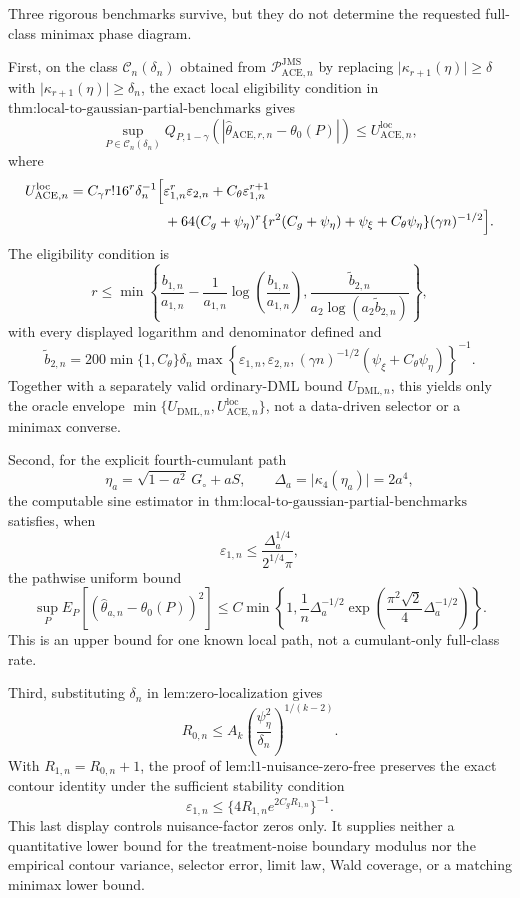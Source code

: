 Three rigorous benchmarks survive, but they do not determine the requested full-class minimax phase diagram.

First, on the class \(\mathcal C_n(\delta_n)\) obtained from \(\mathcal P_{\mathrm{ACE},n}^{\mathrm{JMS}}\) by replacing \(\lvert\kappa_{r+1}(\eta)\rvert\ge\delta\) with \(\lvert\kappa_{r+1}(\eta)\rvert\ge\delta_n\), the exact local eligibility condition in \(\text{thm:local-to-gaussian-partial-benchmarks}\) gives
\[
 \sup_{P\in\mathcal C_n(\delta_n)}
 Q_{P,1-\gamma}
 \!\left(\left|\widehat\theta_{\mathrm{ACE},r,n}-\theta_0(P)\right|\right)
 \le U_{\mathrm{ACE},n}^{\mathrm{loc}},
\]
where
\[
\begin{aligned}
 U_{\mathrm{ACE},n}^{\mathrm{loc}}
 &=C_{\gamma}r!16^r\delta_n^{-1}
 \Bigl[
   \varepsilon_{1,n}^r\varepsilon_{2,n}
   +C_{\theta}\varepsilon_{1,n}^{r+1}\\
 &\hspace{24mm}
   +64(C_g+\psi_{\eta})^r
    \{r^2(C_g+\psi_{\eta})+\psi_{\xi}+C_{\theta}\psi_{\eta}\}
    (\gamma n)^{-1/2}
 \Bigr].
\end{aligned}
\]
The eligibility condition is
\[
 r\le
 \min\!\left\{
   \frac{b_{1,n}}{a_{1,n}}
   -\frac{1}{a_{1,n}}\log\!\left(\frac{b_{1,n}}{a_{1,n}}\right),
   \frac{\widetilde b_{2,n}}{a_2\log(a_2\widetilde b_{2,n})}
 \right\},
\]
with every displayed logarithm and denominator defined and
\[
 \widetilde b_{2,n}
 =200\min\{1,C_{\theta}\}\delta_n
 \max\!\left\{
   \varepsilon_{1,n},\varepsilon_{2,n},
   (\gamma n)^{-1/2}(\psi_{\xi}+C_{\theta}\psi_{\eta})
 \right\}^{-1}.
\]
Together with a separately valid ordinary-DML bound \(U_{\mathrm{DML},n}\), this yields only the oracle envelope \(\min\{U_{\mathrm{DML},n},U_{\mathrm{ACE},n}^{\mathrm{loc}}\}\), not a data-driven selector or a minimax converse.

Second, for the explicit fourth-cumulant path
\[
 \eta_a=\sqrt{1-a^2}\,G_{\circ}+aS,
 \qquad
 \Delta_a=\lvert\kappa_4(\eta_a)\rvert=2a^4,
\]
the computable sine estimator in \(\text{thm:local-to-gaussian-partial-benchmarks}\) satisfies, when
\[
 \varepsilon_{1,n}\le\frac{\Delta_a^{1/4}}{2^{1/4}\pi},
\]
the pathwise uniform bound
\[
 \sup_P E_P\!\left[(\widehat\theta_{a,n}-\theta_0(P))^2\right]
 \le
 C\min\!\left\{
  1,\frac{1}{n}\Delta_a^{-1/2}
  \exp\!\left(\frac{\pi^2\sqrt2}{4}\Delta_a^{-1/2}\right)
 \right\}.
\]
This is an upper bound for one known local path, not a cumulant-only full-class rate.

Third, substituting \(\delta_n\) in \(\text{lem:zero-localization}\) gives
\[
 R_{0,n}\le A_k
 \left(\frac{\psi_{\eta}^2}{\delta_n}\right)^{1/(k-2)}.
\]
With \(R_{1,n}=R_{0,n}+1\), the proof of \(\text{lem:l1-nuisance-zero-free}\) preserves the exact contour identity under the sufficient stability condition
\[
 \varepsilon_{1,n}
 \le\{4R_{1,n}e^{2C_gR_{1,n}}\}^{-1}.
\]
This last display controls nuisance-factor zeros only.  It supplies neither a quantitative lower bound for the treatment-noise boundary modulus nor the empirical contour variance, selector error, limit law, Wald coverage, or a matching minimax lower bound.